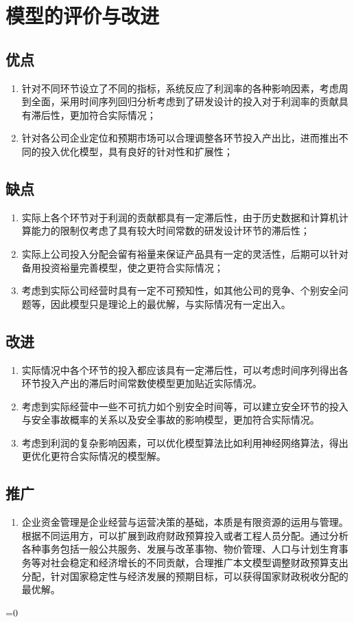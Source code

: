 \documentclass{article}
\begin{document}
\fi
\clearpage
\section{模型的评价与改进}
\subsection{优点}
\begin{enumerate}
	\item 针对不同环节设立了不同的指标，系统反应了利润率的各种影响因素，考虑周到全面，采用时间序列回归分析考虑到了研发设计的投入对于利润率的贡献具有滞后性，更加符合实际情况；
	\item 针对各公司企业定位和预期市场可以合理调整各环节投入产出比，进而推出不同的投入优化模型，具有良好的针对性和扩展性；
\end{enumerate}
\subsection{缺点}
\begin{enumerate}
	\item 实际上各个环节对于利润的贡献都具有一定滞后性，由于历史数据和计算机计算能力的限制仅考虑了具有较大时间常数的研发设计环节的滞后性；
	\item 实际上公司投入分配会留有裕量来保证产品具有一定的灵活性，后期可以针对备用投资裕量完善模型，使之更符合实际情况；
	\item 考虑到实际公司经营时具有一定不可预知性，如其他公司的竞争、个别安全问题等，因此模型只是理论上的最优解，与实际情况有一定出入。
\end{enumerate}
\subsection{改进}
\begin{enumerate}
	\item 实际情况中各个环节的投入都应该具有一定滞后性，可以考虑时间序列得出各环节投入产出的滞后时间常数使模型更加贴近实际情况。
	\item 考虑到实际经营中一些不可抗力如个别安全时间等，可以建立安全环节的投入与安全事故概率的关系以及安全事故的影响模型，更加符合实际情况。
	\item 考虑到利润的复杂影响因素，可以优化模型算法比如利用神经网络算法，得出更优化更符合实际情况的模型解。
\end{enumerate}
\subsection{推广}
\begin{enumerate}
	\item 企业资金管理是企业经营与运营决策的基础，本质是有限资源的运用与管理。根据不同运用方，可以扩展到政府财政预算投入或者工程人员分配。通过分析各种事务包括一般公共服务、发展与改革事物、物价管理、人口与计划生育事务等对社会稳定和经济增长的不同贡献，合理推广本文模型调整财政预算支出分配，针对国家稳定性与经济发展的预期目标，可以获得国家财政税收分配的最优解。
\end{enumerate}
\ifnum{}=0
	
\end{document}
